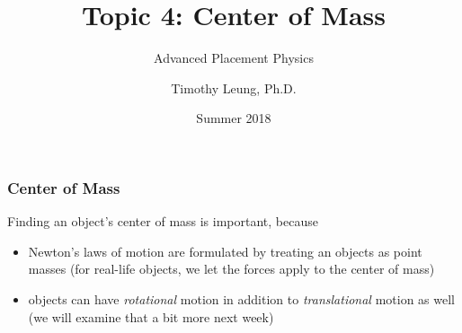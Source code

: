 \documentclass[12pt,compress,aspectratio=169]{beamer}
\title{Topic 4: Center of Mass}
\subtitle{Advanced Placement Physics}
\author[TML]{Timothy Leung, Ph.D.}
\institute{Olympiads School}
\date{Summer 2018}
\begin{document}
\begin{frame}
  \maketitle
\end{frame}

%


\begin{frame}
  \frametitle{Center of Mass}
  Finding an object's center of mass
  is important, because
  \begin{itemize}
  \item Newton's laws of motion are formulated by treating an objects as point
    masses (for real-life objects, we let the forces apply to the center of
    mass)
  \item objects can have \emph{rotational} motion in addition to
    \emph{translational} motion as well (we will examine that a bit more
    next week)
  \end{itemize}
\end{frame}
\end{document}
